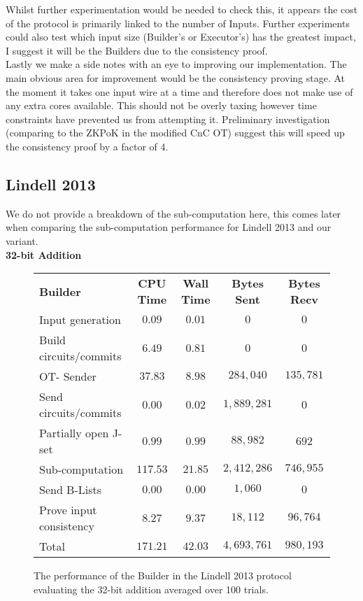 \documentclass[ %
                    author={Nicholas Tutte},
                supervisor={Prof. Nigel Smart},
                    degree={MEng},
                     title={Secure Two Party Computation},
                  subtitle={A practical comparison of recent protocols},
                      type={Research - GG1K},
                      year={2015} ]{dissertation}
\begin{document}
				Whilst further experimentation would be needed to check this, it appears the cost of the protocol is primarily linked to the number of Inputs. Further experiments could also test which input size (Builder's or Executor's) has the greatest impact, I suggest it will be the Builders due to the consistency proof.\\

				Lastly we make a side notes with an eye to improving our implementation. The main obvious area for improvement would be the consistency proving stage. At the moment it takes one input wire at a time and therefore does not make use of any extra cores available. This should not be overly taxing however time constraints have prevented us from attempting it. Preliminary investigation (comparing to the ZKPoK in the modified CnC OT) suggest this will speed up the consistency proof by a factor of 4.

			\subsection{Lindell 2013}
				We do not provide a breakdown of the sub-computation here, this comes later when comparing the sub-computation performance for Lindell 2013 and our variant.\\

				\FloatBarrier
				\noindent \textbf{32-bit Addition}
				\begin{figure}[!ht]
					\begin{tabular}{| p{4.3cm} | c c c c |}
						\hline
						\textbf{Builder} & \textbf{CPU Time} & \textbf{Wall Time} & \textbf{Bytes Sent} & \textbf{Bytes Recv} \\
						\thickhline
						Input generation & $0.09$ & $0.01$ & $0$ & $0$ \\
						\hline
						Build circuits/commits & $6.49$ & $0.81$ & $0$ & $0$ \\
						\hline
						OT- Sender & $37.83$ & $8.98$ & $284,040$ & $135,781$ \\
						\hline
						Send circuits/commits & $0.00$ & $0.02$ & $1,889,281$ & $0$ \\
						\hline
						Partially open J-set & $0.99$ & $0.99$ & $88,982$ & $692$ \\
						\hline
						Sub-computation & $117.53$ & $21.85$ & $2,412,286$ & $746,955$ \\
						\hline
						Send B-Lists & $0.00$ & $0.00$ & $1,060$ & $0$ \\
						\hline
						Prove input consistency & $8.27$ & $9.37$ & $18,112$ & $96,764$ \\
						\thickhline
						Total & $171.21$ & $42.03$ & $4,693,761$ & $980,193$ \\
						\hline
					\end{tabular}
					\caption{The performance of the Builder in the Lindell 2013 protocol evaluating the 32-bit addition averaged over 100 trials. \label{table:L_2013_Add_Builder}}
				\end{figure}
\end{document}
